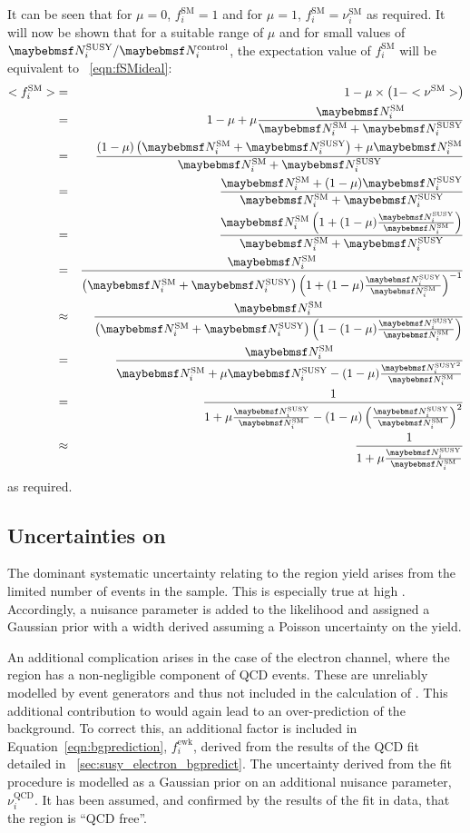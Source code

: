 It can be seen that for $\mu=0$, $f^{\textrm{SM}}_i=1$ and for $\mu=1$,
$f^{\textrm{SM}}_i=\nu^{\textrm{SM}}_i$ as required. It will now be shown that
for a suitable range of $\mu$ and for small values of $\NSUSYi/\NControli$, the
expectation value of $f^{\textrm{SM}}_i$ will be equivalent to
\eqn~\ref{eqn:fSMideal}:
\begin{eqnarray*}
  <f^{\textrm{SM}}_i> &=& 1 - \mu \times \left(1-<\nu^{\textrm{SM}}>\right) \\
  &=& 1 - \mu  + \mu\frac{\NSMi}{\NSMi + \NSUSYi} \\
  &=& \frac{(1-\mu)\left(\NSMi + \NSUSYi\right) + \mu\NSMi}{\NSMi + \NSUSYi} \\
  &=& \frac{\NSMi + (1 - \mu)\NSUSYi}{\NSMi + \NSUSYi} \\
  &=& \frac{\NSMi \left( 1 + (1-\mu)\frac{\NSUSYi}{\NSMi}\right)}{\NSMi + \NSUSYi} \\
  &=& \frac{\NSMi}{\left(\NSMi +\NSUSYi\right)\left( 1 + (1 - \mu)\frac{\NSUSYi}{\NSMi}\right)^{-1}} \\
  &\approx& \frac{\NSMi}{\left(\NSMi +\NSUSYi\right)\left( 1 - (1-\mu)\frac{\NSUSYi}{\NSMi}\right)} \\
  &=& \frac{\NSMi}{\NSMi + \mu\NSUSYi - (1-\mu)\frac{\NSUSYi^2}{\NSMi}}\\
  &=& \frac{1}{1 + \mu\frac{\NSUSYi}{\NSMi} - (1-\mu)\left(\frac{\NSUSYi}{\NSMi}\right)^2} \\
  &\approx& \frac{1}{1 + \mu\frac{\NSUSYi}{\NSMi}}
\end{eqnarray*}
as required.

\subsection[Uncertainties on \texorpdfstring{\NControli}{NControli}]{Uncertainties on \boldmath{\NControli}}
The dominant systematic uncertainty relating to the \LPcontrol region yield
arises from the limited number of events in the sample. This is especially true
at high \STlep. Accordingly, a nuisance parameter is added to the likelihood and
assigned a Gaussian prior with a width derived assuming a Poisson uncertainty on the
\NControli yield.

An additional complication arises in the case of the electron channel, where the
\LPcontrol region has a non-negligible component of \ac{QCD} events. These are
unreliably modelled by event generators and thus not included in the calculation
of \RCSi. This additional contribution to \NControli would again lead to an
over-prediction of the background. To correct this, an additional factor is
included in Equation~\ref{eqn:bgprediction}, $f^{\textrm{ewk}}_i$, derived from
the results of the \ac{QCD} fit detailed in
\sec~\ref{sec:susy_electron_bgpredict}. The uncertainty derived from the fit
procedure is modelled as a Gaussian prior on an additional nuisance parameter,
$\nu^{\textrm{QCD}}_i$. It has been assumed, and confirmed by the results of the
fit in data, that the region \LPsignal is ``\ac{QCD} free''.

